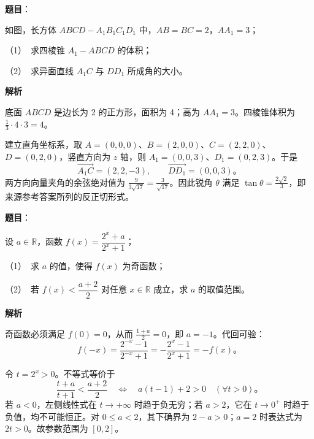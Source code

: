 \begin{answer}

\textbf{题目}：

如图，长方体 $ABCD-A_1B_1C_1D_1$ 中，$AB=BC=2$，$AA_1=3$；
\nopagebreak[4]
\begin{center}\end{center}
\nopagebreak[4]
（1）　求四棱锥 $A_1-ABCD$ 的体积；

（2）　求异面直线 $A_1C$ 与 $DD_1$ 所成角的大小。

\textbf{解析}


底面 $ABCD$ 是边长为 2 的正方形，面积为 4；高为 $AA_1=3$。四棱锥体积为 $\frac13\cdot4\cdot3=4$。


建立直角坐标系，取 $A=(0,0,0)$、$B=(2,0,0)$、$C=(2,2,0)$、$D=(0,2,0)$，竖直方向为 $z$ 轴，则 $A_1=(0,0,3)$、$D_1=(0,2,3)$。于是
\nopagebreak[4]
\[
\overrightarrow{A_1C}=(2,2,-3),\qquad
\overrightarrow{DD_1}=(0,0,3)\mbox{。}
\]
两方向向量夹角的余弦绝对值为 $\frac9{3\sqrt{17}}=\frac3{\sqrt{17}}$。因此锐角 $\theta$ 满足 $\tan\theta=\frac{2\sqrt2}{3}$，即来源参考答案所列的反正切形式。



\end{answer}
\begin{answer}

\textbf{题目}：

设 $a\in\mathbb R$，函数 $f(x)=\dfrac{2^x+a}{2^x+1}$；

（1）　求 $a$ 的值，使得 $f(x)$ 为奇函数；

（2）　若 $f(x)<\dfrac{a+2}{2}$ 对任意 $x\in\mathbb R$ 成立，求 $a$ 的取值范围。

\textbf{解析}


奇函数必须满足 $f(0)=0$，从而 $\frac{1+a}{2}=0$，即 $a=-1$。代回可验：
\nopagebreak[4]
\[
f(-x)=\frac{2^{-x}-1}{2^{-x}+1}
=-\frac{2^x-1}{2^x+1}=-f(x)\mbox{。}
\]


令 $t=2^x>0$。不等式等价于
\nopagebreak[4]
\[
\frac{t+a}{t+1}<\frac{a+2}{2}
\quad\Longleftrightarrow\quad a(t-1)+2>0\quad(\forall t>0)\mbox{。}
\]
若 $a<0$，左侧线性式在 $t\to+\infty$ 时趋于负无穷；若 $a>2$，它在 $t\to0^+$ 时趋于负值，均不可能恒正。对 $0\le a<2$，其下确界为 $2-a>0$；$a=2$ 时表达式为 $2t>0$。故参数范围为 $[0,2]$。



\end{answer}
